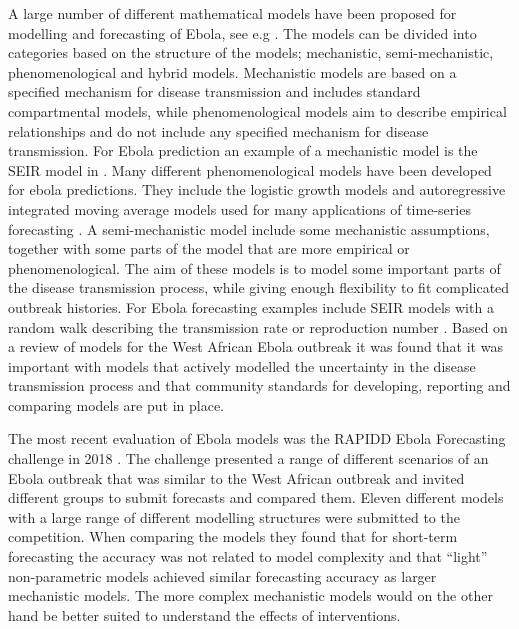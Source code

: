 \documentclass[12pt]{article}
\begin{document}
A large number of different mathematical models have been proposed for modelling and forecasting of Ebola, see e.g \cite{chretienMathematicalModelingWest,viboudRAPIDDEbolaForecasting2018}. The models can be divided into categories based on the structure of the models; mechanistic, semi-mechanistic, phenomenological and hybrid models. Mechanistic models are based on a specified mechanism for disease transmission and includes standard compartmental models, while phenomenological models aim to describe empirical relationships and do not include any specified mechanism for disease transmission. For Ebola prediction an example of a mechanistic model is the SEIR model in \cite{gaffeyApplicationCDCEbolaResponse2018}. Many different phenomenological models have been developed for ebola predictions. They include the logistic growth models \cite{pellUsingPhenomenologicalModels2018} and autoregressive integrated moving average models used for many applications of time-series forecasting \cite{mForecastingTrendCases2017}. A semi-mechanistic model include some mechanistic assumptions, together with some parts of the model that are more empirical or phenomenological. The aim of these models is to model some important parts of the disease transmission process, while giving enough flexibility to fit complicated outbreak histories. For Ebola forecasting examples include SEIR models with a random walk describing the transmission rate or reproduction number  \cite{funkAssessingPerformanceRealtime2019,asherForecastingEbolaRegression2018}. Based on a review of models for the West African Ebola outbreak it was found that it was important with models that actively modelled the uncertainty in the disease transmission process \cite{chretienMathematicalModelingWest, kingAvoidableErrorsModelling2015} and that community standards for developing, reporting and comparing models are put in place. 

The most recent evaluation of Ebola models was the RAPIDD Ebola Forecasting challenge in 2018 \cite{viboudRAPIDDEbolaForecasting2018}. The challenge presented a range of different scenarios of an Ebola outbreak that was similar to the West African outbreak and invited different groups to submit forecasts and compared them. Eleven different models with a large range of different modelling structures were submitted to the competition. When comparing the models they found that for short-term forecasting the accuracy was not related to model complexity and that ``light'' non-parametric models achieved similar forecasting accuracy as larger mechanistic models. The more complex mechanistic models would on the other hand be better suited to understand the effects of interventions. 
\end{document}
